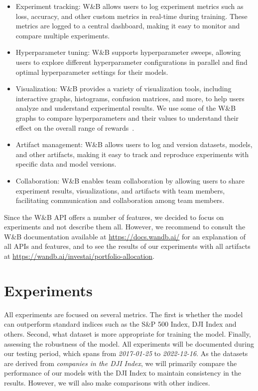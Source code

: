 \documentclass[../xlapes02]{subfiles}
\begin{document}
    \begin{itemize}
        \item Experiment tracking: W\&B allows users to log experiment metrics such as loss, accuracy, and other custom metrics in real-time during training. These metrics are logged to a central dashboard, making it easy to monitor and compare multiple experiments.
        \item Hyperparameter tuning: W\&B supports hyperparameter sweeps, allowing users to explore different hyperparameter configurations in parallel and find optimal hyperparameter settings for their models.
        \item Visualization: W\&B provides a variety of visualization tools, including interactive graphs, histograms, confusion matrices, and more, to help users analyze and understand experimental results. We use some of the W\&B graphs to compare hyperparameters and their values to understand their effect on the overall range of rewards~.
        \item Artifact management: W\&B allows users to log and version datasets, models, and other artifacts, making it easy to track and reproduce experiments with specific data and model versions.
        \item Collaboration: W\&B enables team collaboration by allowing users to share experiment results, visualizations, and artifacts with team members, facilitating communication and collaboration among team members.
    \end{itemize}

    Since the W\&B API offers a number of features, we decided to focus on experiments and not describe them all. However, we recommend to consult the W\&B documentation available at \url{https://docs.wandb.ai/} for an explanation of all APIs and features, and to see the results of our experiments with all artifacts at \url{https://wandb.ai/investai/portfolio-allocation}.


    \section{Experiments}\label{sec:experiments}
    All experiments are focused on several metrics. The first is whether the model can outperform standard indices such as the S\&P 500 Index, DJI Index and others. Second, what dataset is more appropriate for training the model. Finally, assessing the robustness of the model. All experiments will be documented during our testing period, which spans from \emph{2017-01-25} to \emph{2022-12-16}. As the datasets are derived from \emph{companies in the DJI Index}, we will primarily compare the performance of our models with the DJI Index to maintain consistency in the results. However, we will also make comparisons with other indices.
\end{document}
